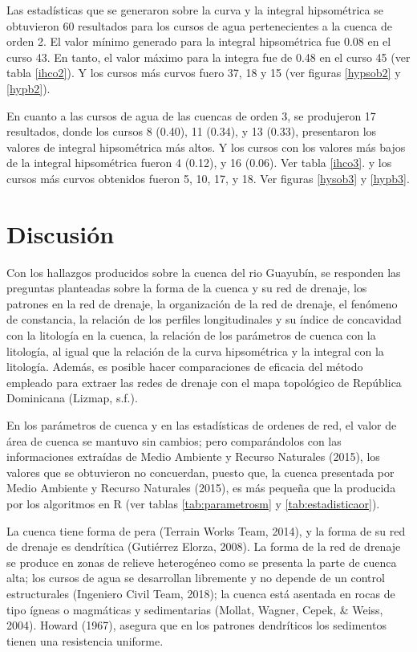 \documentclass[11pt,]{article}
\begin{document}
Las estadísticas que se generaron sobre la curva y la integral
hipsométrica se obtuvieron 60 resultados para los cursos de agua
pertenecientes a la cuenca de orden 2. El valor mínimo generado para la
integral hipsométrica fue 0.08 en el curso 43. En tanto, el valor máximo
para la integra fue de 0.48 en el curso 45 (ver tabla \ref{ihco2}). Y
los cursos más curvos fuero 37, 18 y 15 (ver figuras \ref{hypsob2} y
\ref{hypb2}).

En cuanto a las cursos de agua de las cuencas de orden 3, se produjeron
17 resultados, donde los cursos 8 (0.40), 11 (0.34), y 13 (0.33),
presentaron los valores de integral hipsométrica más altos. Y los cursos
con los valores más bajos de la integral hipsométrica fueron 4 (0.12), y
16 (0.06). Ver tabla \ref{ihco3}. y los cursos más curvos obtenidos
fueron 5, 10, 17, y 18. Ver figuras \ref{hysob3} y \ref{hypb3}.

\section{Discusión}\label{discusiuxf3n}

Con los hallazgos producidos sobre la cuenca del rio Guayubín, se
responden las preguntas planteadas sobre la forma de la cuenca y su red
de drenaje, los patrones en la red de drenaje, la organización de la red
de drenaje, el fenómeno de constancia, la relación de los perfiles
longitudinales y su índice de concavidad con la litología en la cuenca,
la relación de los parámetros de cuenca con la litología, al igual que
la relación de la curva hipsométrica y la integral con la litología.
Además, es posible hacer comparaciones de eficacia del método empleado
para extraer las redes de drenaje con el mapa topológico de República
Dominicana (Lizmap, s.f.).

En los parámetros de cuenca y en las estadísticas de ordenes de red, el
valor de área de cuenca se mantuvo sin cambios; pero comparándolos con
las informaciones extraídas de Medio Ambiente y Recurso Naturales
(2015), los valores que se obtuvieron no concuerdan, puesto que, la
cuenca presentada por Medio Ambiente y Recurso Naturales (2015), es más
pequeña que la producida por los algoritmos en R (ver tablas
\ref{tab:parametrosm} y \ref{tab:estadisticaor}).

La cuenca tiene forma de pera (Terrain Works Team, 2014), y la forma de
su red de drenaje es dendrítica (Gutiérrez Elorza, 2008). La forma de la
red de drenaje se produce en zonas de relieve heterogéneo como se
presenta la parte de cuenca alta; los cursos de agua se desarrollan
libremente y no depende de un control estructurales (Ingeniero Civil
Team, 2018); la cuenca está asentada en rocas de tipo ígneas o
magmáticas y sedimentarias (Mollat, Wagner, Cepek, \& Weiss, 2004).
Howard (1967), asegura que en los patrones dendríticos los sedimentos
tienen una resistencia uniforme.
\end{document}
